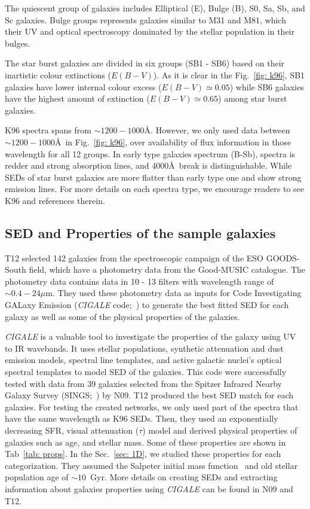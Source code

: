     The quiescent group of galaxies includes Elliptical (E), Bulge (B), S0, Sa, Sb, and Sc galaxies.
    Bulge groups represents galaxies similar to M31 and M81, which their UV and optical spectroscopy dominated by the stellar population in their bulges.
    
    The star burst galaxies are divided in six groups (SB1 - SB6) based on their inartistic colour extinctions ($E(B-V)$). 
    As it is clear in the Fig.~\ref{fig: k96}, SB1 galaxies have lower internal colour excess ($E(B-V) \simeq 0.05$) while SB6 galaxies have the highest amount of extinction ($E(B-V) \simeq 0.65$) among star burst galaxies.
    
    K96 spectra spans from $\sim1200-1000$\AA.
    However, we only used data between $\sim1200-1000$\AA~in Fig.~\ref{fig: k96}, over availability of flux information in those wavelength for all 12 groups.
    In early type galaxies spectrum (B-Sb), spectra is redder and strong absorption lines, and 4000\AA~break is distinguishable. 
    While SEDs of star burst galaxies are more flatter than early type one and show strong emission lines.
    For more details on each spectra type, we encourage readers to see K96 and references therein. 
    

 \subsection{SED and Properties of the sample galaxies}
    T12 selected 142 galaxies from the spectroscopic campaign of the ESO GOODS-South field, which have a photometry data from the Good-MUSIC catalogue. 
    The photometry data contains data in 10 - 13 filters with wavelength range of $\sim 0.4-24 \mu$m. 
    They used these photometry data as inputs for Code Investigating GALaxy Emission ({\em CIGALE} code;~\citep{Noll09}) to generate the best fitted SED for each galaxy as well as some of the physical properties of the galaxies.
    
    {\em CIGALE} is a valuable tool to investigate the properties of the galaxy using UV to IR wavebands.
    It uses stellar populations, synthetic attenuation and dust emission models, spectral line templates, and active galactic nuclei's optical spectral templates to model SED of the galaxies.
    This code were successfully tested with data from 39 galaxies selected from the Spitzer Infrared Nearby Galaxy Survey (SINGS;~\citep{Kennicutt03}) by N09.
    T12 produced the best SED match for each galaxies.
    For testing the created networks, we only used part of the spectra that have the same wavelength as K96 SEDs.
    Then, they used an exponentially decreasing SFR, visual attenuation ($\tau$) model and derived physical properties of galaxies such as age, and stellar mass.
    Some of these properties are shown in Tab~\ref{tab: props}.
    In the Sec.~\ref{sec: 1D}, we studied these properties for each categorization.
    They assumed the Salpeter initial mass function~\citep{Salpeter55} and old stellar population age of $\sim 10$~Gyr.
    More details on creating SEDs and extracting information about galaxies properties using {\em CIGALE} can be found in N09 and T12.
    
